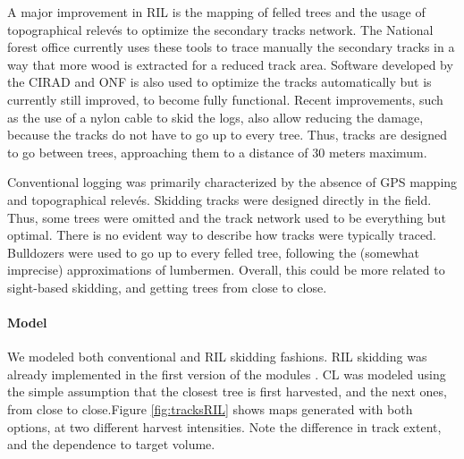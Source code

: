 \documentclass[12pt,]{article}
\theoremstyle{definition}
\theoremstyle{definition}
\theoremstyle{definition}
\theoremstyle{remark}
\begin{document}
A major improvement in RIL is the mapping of felled trees and the usage
of topographical relevés to optimize the secondary tracks network. The
National forest office currently uses these tools to trace manually the
secondary tracks in a way that more wood is extracted for a reduced
track area. Software developed by the CIRAD and ONF is also used to
optimize the tracks automatically but is currently still improved, to
become fully functional. Recent improvements, such as the use of a nylon
cable to skid the logs, also allow reducing the damage, because the
tracks do not have to go up to every tree. Thus, tracks are designed to
go between trees, approaching them to a distance of 30 meters maximum.

Conventional logging was primarily characterized by the absence of GPS
mapping and topographical relevés. Skidding tracks were designed
directly in the field. Thus, some trees were omitted and the track
network used to be everything but optimal. There is no evident way to
describe how tracks were typically traced. Bulldozers were used to go up
to every felled tree, following the (somewhat imprecise) approximations
of lumbermen. Overall, this could be more related to sight-based
skidding, and getting trees from close to close.

\paragraph{Model}\label{model-5}

We modeled both conventional and RIL skidding fashions. RIL skidding was
already implemented in the first version of the modules
\citep[see][]{Schmitt2017}. CL was modeled using the simple assumption
that the closest tree is first harvested, and the next ones, from close
to close.Figure \ref{fig:tracksRIL} shows maps generated with both
options, at two different harvest intensities. Note the difference in
track extent, and the dependence to target volume.
\end{document}
